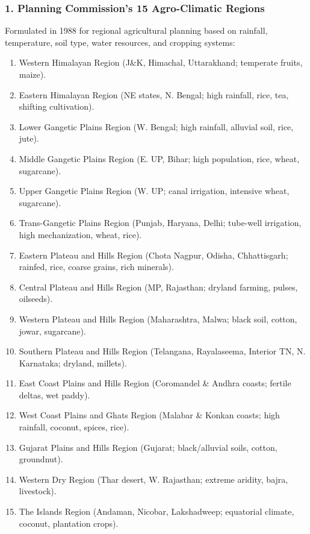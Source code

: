 \documentclass[11pt,a4paper]{article}
\begin{document}
\subsubsection{1. Planning Commission's 15 Agro-Climatic Regions}
Formulated in 1988 for regional agricultural planning based on rainfall, temperature, soil type, water resources, and cropping systems:
\begin{enumerate}[leftmargin=*]
  \item Western Himalayan Region (J\&K, Himachal, Uttarakhand; temperate fruits, maize).
  \item Eastern Himalayan Region (NE states, N. Bengal; high rainfall, rice, tea, shifting cultivation).
  \item Lower Gangetic Plains Region (W. Bengal; high rainfall, alluvial soil, rice, jute).
  \item Middle Gangetic Plains Region (E. UP, Bihar; high population, rice, wheat, sugarcane).
  \item Upper Gangetic Plains Region (W. UP; canal irrigation, intensive wheat, sugarcane).
  \item Trans-Gangetic Plains Region (Punjab, Haryana, Delhi; tube-well irrigation, high mechanization, wheat, rice).
  \item Eastern Plateau and Hills Region (Chota Nagpur, Odisha, Chhattisgarh; rainfed, rice, coarse grains, rich minerals).
  \item Central Plateau and Hills Region (MP, Rajasthan; dryland farming, pulses, oilseeds).
  \item Western Plateau and Hills Region (Maharashtra, Malwa; black soil, cotton, jowar, sugarcane).
  \item Southern Plateau and Hills Region (Telangana, Rayalaseema, Interior TN, N. Karnataka; dryland, millets).
  \item East Coast Plains and Hills Region (Coromandel \& Andhra coasts; fertile deltas, wet paddy).
  \item West Coast Plains and Ghats Region (Malabar \& Konkan coasts; high rainfall, coconut, spices, rice).
  \item Gujarat Plains and Hills Region (Gujarat; black/alluvial soils, cotton, groundnut).
  \item Western Dry Region (Thar desert, W. Rajasthan; extreme aridity, bajra, livestock).
  \item The Islands Region (Andaman, Nicobar, Lakshadweep; equatorial climate, coconut, plantation crops).
\end{enumerate}
\end{document}
